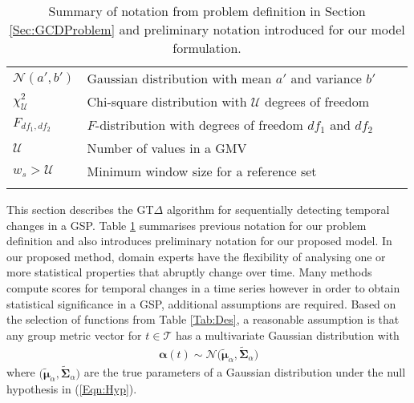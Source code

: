 \begin{table}[h]
\begin{center}
{\begin{tabular}{llcl  }
\\[1mm]
$\mathcal{N}(a',b')$ &  Gaussian distribution with mean $a'$ and variance $b'$ \\[1mm]
$\chi^2 _{\mathcal{U}}$ & Chi-square distribution with $\mathcal{U}$ degrees of freedom\\[1mm]
$F_{df_1,df_2}$ & $F$-distribution with degrees of freedom $df_1$ and $ df_2$\\[1mm]
 $\mathcal{U}$ & Number of values in a GMV \\[1mm]
$w_s > \mathcal{U}$ & Minimum window size for a reference set \\[1mm]
	 \hline\\[-2mm]
	 \end{tabular}
	 }
	\end{center}
	\caption{  Summary of notation from problem definition in Section \ref{Sec:GCDProblem} and preliminary notation introduced for our model formulation. }
\label{Tab:GCDNotation}
\end{table} 


 This section  describes the GT$\Delta$ algorithm  for sequentially detecting temporal changes in a  GSP. Table \ref{Tab:GCDNotation} summarises previous notation for our problem definition and also introduces preliminary notation for our proposed model.  In our proposed method,  domain experts have the flexibility of analysing
one or more statistical properties that abruptly change over   time.  
Many methods compute scores  for temporal changes in a  time series however
in order to obtain statistical significance in a GSP,  additional assumptions are required. 
  Based on the selection of functions from Table \ref{Tab:Des}, a reasonable assumption is that any group metric vector for $t \in \mathcal{T}$ 
  has a multivariate Gaussian distribution with   
\begin{align}
 {\boldsymbol \alpha}(t) \sim \mathcal{N} \Big( \tilde{\boldsymbol \mu}_\alpha , \tilde{\boldsymbol \Sigma }_\alpha \Big ) \label{Zgauss}
\end{align} 
where $\big( \tilde{\boldsymbol \mu}_\alpha , \tilde{\boldsymbol \Sigma}_\alpha \big) $ are the true parameters of a Gaussian distribution under the null hypothesis in (\ref{Eqn:Hyp}). 
  
